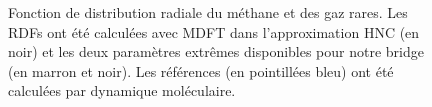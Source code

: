 \begin{figure}[H]
\begin{subfigure}{.5\textwidth}
{
    }
  \end{subfigure}
  \caption[Fonction de distribution radiale du méthane et des gaz rares.]{Fonction de distribution radiale du méthane et des gaz rares. Les RDFs ont été calculées avec MDFT dans l'approximation HNC (en noir) et les deux paramètres extrêmes disponibles pour notre bridge (en marron et noir). Les références (en pointillées bleu) ont été calculées par dynamique moléculaire.}
  \label{fig:g_of_r_molecules_modeles}
\end{figure}

